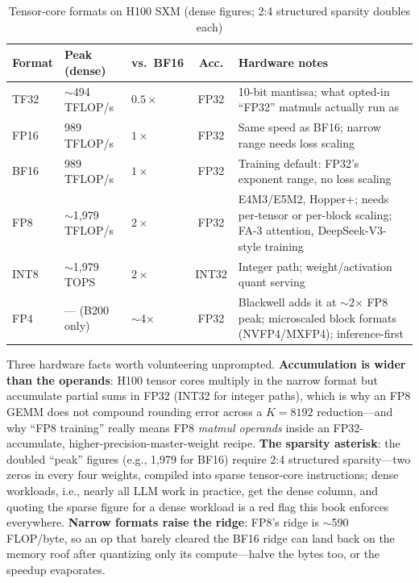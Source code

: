 \begin{table}[H]
\centering
\small
\caption{Tensor-core formats on H100 SXM (dense figures; 2:4 structured sparsity doubles each)}
\label{tab:precision_hw}
\begin{tabularx}{\textwidth}{lllcX}
\toprule
\textbf{Format} & \textbf{Peak (dense)} & \textbf{vs.\ BF16} & \textbf{Acc.} & \textbf{Hardware notes} \\
\midrule
TF32 & $\sim$494 TFLOP/s & $0.5\times$ & FP32 & 10-bit mantissa; what opted-in ``FP32'' matmuls actually run as \\
FP16 & 989 TFLOP/s & $1\times$ & FP32 & Same speed as BF16; narrow range needs loss scaling \\
BF16 & 989 TFLOP/s & $1\times$ & FP32 & Training default: FP32's exponent range, no loss scaling \\
FP8 & $\sim$1{,}979 TFLOP/s & $2\times$ & FP32 & E4M3/E5M2, Hopper+; needs per-tensor or per-block scaling; FA-3 attention, DeepSeek-V3-style training \\
INT8 & $\sim$1{,}979 TOPS & $2\times$ & INT32 & Integer path; weight/activation quant serving \\
FP4 & --- (B200 only) & $\sim$4$\times$ & FP32 & Blackwell adds it at $\sim$2$\times$ FP8 peak; microscaled block formats (NVFP4/MXFP4); inference-first \\
\bottomrule
\end{tabularx}
\end{table}

Three hardware facts worth volunteering unprompted. \textbf{Accumulation is wider than the operands}: H100 tensor cores multiply in the narrow format but accumulate partial sums in FP32 (INT32 for integer paths), which is why an FP8 GEMM does not compound rounding error across a $K = 8192$ reduction---and why ``FP8 training'' really means FP8 \textit{matmul operands} inside an FP32-accumulate, higher-precision-master-weight recipe. \textbf{The sparsity asterisk}: the doubled ``peak'' figures (e.g., 1{,}979 for BF16) require 2:4 structured sparsity---two zeros in every four weights, compiled into sparse tensor-core instructions; dense workloads, i.e., nearly all LLM work in practice, get the dense column, and quoting the sparse figure for a dense workload is a red flag this book enforces everywhere. \textbf{Narrow formats raise the ridge}: FP8's ridge is $\sim$590 FLOP/byte, so an op that barely cleared the BF16 ridge can land back on the memory roof after quantizing only its compute---halve the bytes too, or the speedup evaporates.

